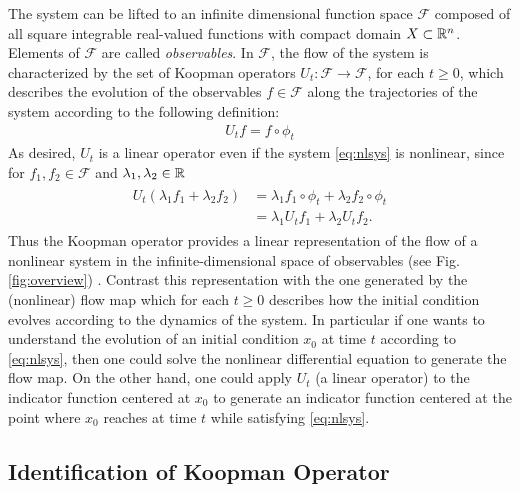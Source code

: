 The system can be lifted to an infinite dimensional function space $\mathcal{F}$ composed of all square integrable real-valued functions with compact domain $X \subset \mathbb{R}^n$.
Elements of $\mathcal{F}$ are called \emph{observables}.
In $\mathcal{F}$, the flow of the system is characterized by the set %
of Koopman operators 
$U_t : \mathcal{F} \to \mathcal{F}$, for each $t \geq 0$,
which describes the evolution of the observables ${f \in \mathcal{F}}$ along the trajectories of the system according to the following definition:
\begin{align}
    U_t f = f \circ \phi_t      
    \label{eq:koopman}
\end{align}
As desired, $U_t$ is a linear operator even if the system \eqref{eq:nlsys} is nonlinear, since for $f_1, f_2 \in \mathcal{F}$ and $\lambda_1, \lambda_2 \in \mathbb{R}$
\begin{align}
    \begin{split}
    U_t (\lambda_1 f_1 + \lambda_2 f_2) &= \lambda_1 f_1 \circ \phi_t + \lambda_2 f_2 \circ \phi_t \\
    &= \lambda_1 U_t f_1 + \lambda_2 U_t f_2.
    \end{split}
\end{align}
Thus the Koopman operator provides a linear representation of the flow of a nonlinear system in the infinite-dimensional space of observables (see Fig. \ref{fig:overview}) \cite{budivsic2012applied}.
Contrast this representation with the one generated by the (nonlinear) flow map which for each $t \geq 0$ describes how the initial condition evolves according to the dynamics of the system.
In particular if one wants to understand the evolution of an initial condition $x_0$ at time $t$ according to \eqref{eq:nlsys}, then one could solve the nonlinear differential equation to generate the flow map. 
On the other hand, one could apply $U_t$ (a linear operator) to the indicator function centered at $x_0$ to generate an indicator function centered at the point where $x_0$ reaches at time $t$ while satisfying \eqref{eq:nlsys}. 


\subsection{Identification of Koopman Operator}
\label{sec:koopid}

